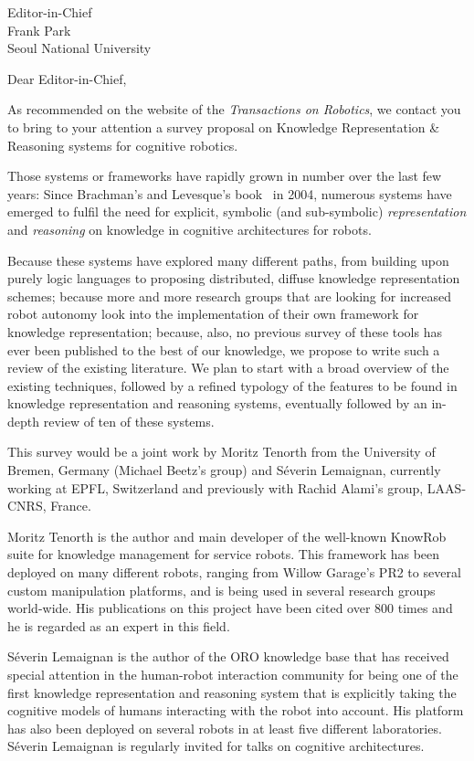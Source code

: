 \documentclass{letter}
\begin{document}
\newcommand{\todo}[1]{\textcolor{red}{\textbf{TODO:} #1}}

\begin{letter}{Editor-in-Chief \\ Frank Park \\ Seoul National University}
\opening{Dear Editor-in-Chief,}

As recommended on the website of the \emph{Transactions on Robotics}, we contact
you to bring to your attention a survey proposal on Knowledge Representation \&
Reasoning systems for cognitive robotics.

Those systems or frameworks have rapidly grown in number over the last few
years: Since Brachman's and Levesque's book~\cite{brachman2004knowledge} in 
2004, numerous systems have emerged to fulfil the need for explicit, symbolic (and
sub-symbolic) \emph{representation} and \emph{reasoning} on knowledge in
cognitive architectures for robots.

Because these systems have explored many different paths, from building upon purely
logic languages to proposing distributed, diffuse knowledge representation
schemes; because more and more research groups that are looking for increased
robot autonomy look into the implementation of their own framework for knowledge
representation; because, also, no previous survey of these tools has ever been
published to the best of our knowledge, we propose to write such a review of the
existing literature. We plan to start with a broad overview of the existing techniques,
followed by a refined typology of the features to be found in knowledge
representation and reasoning systems, eventually followed by an in-depth review
of ten of these systems.

This survey would be a joint work by Moritz Tenorth from the University of
Bremen, Germany (Michael Beetz's group) and Séverin Lemaignan, currently working
at EPFL, Switzerland and previously with Rachid Alami's group, LAAS-CNRS, France.

Moritz Tenorth is the author and main developer of the well-known {\sc KnowRob}
suite for knowledge management for service robots. This framework has been
deployed on many different robots, ranging from Willow Garage's PR2 to several
custom manipulation platforms, and is being used in several research groups 
world-wide. His publications on this project have been cited over 800 times 
and he is regarded as an expert in this field.

Séverin Lemaignan is the author of the {\sc ORO} knowledge base that has
received special attention in the human-robot interaction community for being
one of the first knowledge representation and reasoning system that is explicitly
taking the cognitive models of humans interacting with the robot into account. 
His platform has also been deployed on several robots in at least five different
laboratories. Séverin Lemaignan is regularly invited for talks on cognitive
architectures.


\end{letter}
\end{document}
